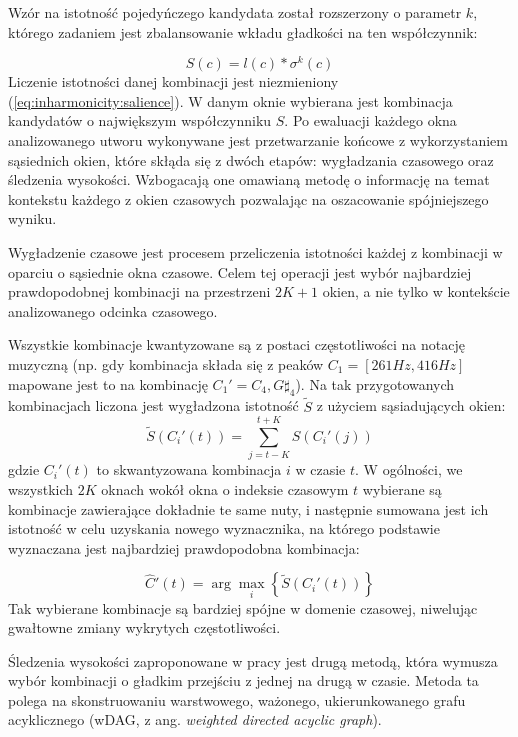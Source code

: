 \documentclass[12pt,a4paper,twoside]{mwart}
\begin{document}
Wzór na istotność pojedyńczego kandydata został rozszerzony o parametr $k$, którego zadaniem jest zbalansowanie wkładu gładkości na ten współczynnik:

\begin{equation}\label{eq:inharmonicity2:salience}
S(c) = l(c) * \sigma^k(c)
\end{equation}
Liczenie istotności danej kombinacji jest niezmieniony (\ref{eq:inharmonicity:salience}). W danym oknie wybierana jest kombinacja kandydatów o największym współczynniku $S$. Po ewaluacji każdego okna analizowanego utworu wykonywane jest przetwarzanie końcowe z wykorzystaniem sąsiednich okien, które skłąda się z dwóch etapów: wygładzania czasowego oraz śledzenia wysokości. Wzbogacają one omawianą metodę o informację na temat kontekstu każdego z okien czasowych pozwalając na oszacowanie spójniejszego wyniku.

Wygładzenie czasowe jest procesem przeliczenia istotności każdej z kombinacji w oparciu o sąsiednie okna czasowe. Celem tej operacji jest wybór najbardziej prawdopodobnej kombinacji na przestrzeni $2K + 1$ okien, a nie tylko w kontekście analizowanego odcinka czasowego.

Wszystkie kombinacje kwantyzowane są z postaci częstotliwości na notację muzyczną (np. gdy kombinacja składa się z peaków $C_1 = [261 Hz, 416 Hz]$ mapowane jest to na kombinację $C_1' = {C_4, G\sharp_4}$). Na tak przygotowanych kombinacjach liczona jest wygładzona istotność $\widetilde{S}$ z użyciem sąsiadujących okien:
\begin{equation} \label{eq:inharmonicity2:smoothedSalience}
  \widetilde{S}(C_i'(t)) = \sum_{j = t - K}^{t+K}S(C_i'(j))
\end{equation}
gdzie $C_i'(t)$ to skwantyzowana kombinacja $i$ w czasie $t$. W ogólności, we wszystkich $2K$ oknach wokół okna o indeksie czasowym $t$ wybierane są kombinacje zawierające dokładnie te same nuty, i następnie sumowana jest ich istotność w celu uzyskania nowego wyznacznika, na którego podstawie wyznaczana jest najbardziej prawdopodobna kombinacja:

\begin{equation} \label{eq:inharmonicity2:smoothedSalience:winner}
\widehat{C}'(t) = \arg \max_i \left\{\widetilde{S}(C_i'(t))\right\}
\end{equation}
Tak wybierane kombinacje są bardziej spójne w domenie czasowej, niwelując gwałtowne zmiany wykrytych częstotliwości.

Śledzenia wysokości zaproponowane w pracy \cite[7-8]{Transcription:Pertus:Inharmonicity2} jest drugą metodą, która wymusza wybór kombinacji o gładkim przejściu z jednej na drugą w czasie. Metoda ta polega na skonstruowaniu warstwowego, ważonego, ukierunkowanego grafu acyklicznego (wDAG, z ang. \textit{weighted directed acyclic graph}).
\end{document}
